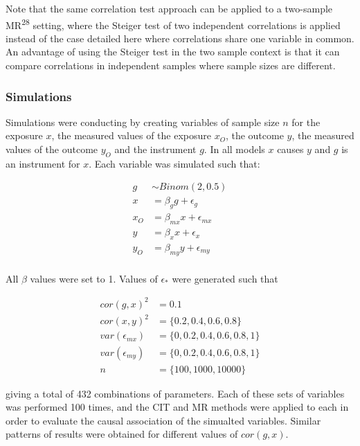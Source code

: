 \documentclass[]{article}
\begin{document}
Note that the same correlation test approach can be applied to a
two-sample MR\textsuperscript{28} setting, where the Steiger test of two
independent correlations is applied instead of the case detailed here
where correlations share one variable in common. An advantage of using
the Steiger test in the two sample context is that it can compare
correlations in independent samples where sample sizes are different.

\subsubsection{Simulations}\label{simulations}

Simulations were conducting by creating variables of sample size \(n\)
for the exposure \(x\), the measured values of the exposure \(x_O\), the
outcome \(y\), the measured values of the outcome \(y_O\) and the
instrument \(g\). In all models \(x\) causes \(y\) and \(g\) is an
instrument for \(x\). Each variable was simulated such that:

\[
\begin{aligned}
g & \sim Binom(2, 0.5) \\
x & = \beta_g g + \epsilon_g \\
x_O & = \beta_{mx} x + \epsilon_{mx} \\
y & = \beta_x x + \epsilon_x \\
y_O & = \beta_{my} y + \epsilon_{my} \\
\end{aligned}
\]

All \(\beta\) values were set to 1. Values of \(\epsilon_*\) were
generated such that

\[
\begin{aligned}
cor(g, x)^2 & = 0.1 \\
cor(x, y)^2 & = \{0.2, 0.4, 0.6, 0.8\} \\
var(\epsilon_{mx}) & = \{0, 0.2, 0.4, 0.6, 0.8, 1\} \\
var(\epsilon_{my}) & = \{0, 0.2, 0.4, 0.6, 0.8, 1\} \\
n & = \{100, 1000, 10000\}
\end{aligned}
\]

giving a total of 432 combinations of parameters. Each of these sets of
variables was performed 100 times, and the CIT and MR methods were
applied to each in order to evaluate the causal association of the
simualted variables. Similar patterns of results were obtained for
different values of \(cor(g, x)\).
\end{document}
